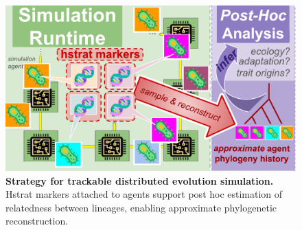 \begin{figure}
  \vspace{2ex}
    \centering
  \includegraphics[width=0.8\linewidth]{img/runtime-posthoc-schematic}
  \vspace{-1.5ex}
    \caption{\textbf{Strategy for trackable distributed evolution simulation.}
    \footnotesize %
    Hstrat markers attached to agents support post hoc estimation of relatedness between lineages, enabling approximate phylogenetic reconstruction.
    }
    \label{fig:runtime-posthoc-schematic}
\vspace{-0.2in}
\end{figure}
